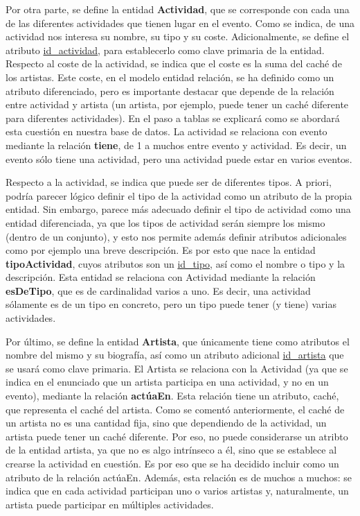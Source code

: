 \documentclass[a4paper,onecolumn]{article}
\begin{document}
\begin{sloppypar}
Por otra parte, se define la entidad \textbf{Actividad}, que se corresponde con cada una de las diferentes actividades que tienen lugar en el evento.
Como se indica, de una actividad nos interesa su nombre, su tipo y su coste. Adicionalmente, se define el atributo \underline{id\_actividad}, para 
establecerlo como clave primaria de la entidad. Respecto al coste de la actividad, se indica que el coste es la suma del caché de los artistas. 
Este coste, en el modelo entidad relación, se ha definido como un atributo diferenciado, pero es importante destacar que depende de la relación entre
actividad y artista (un artista, por ejemplo, puede tener un caché diferente para diferentes actividades). En el paso a tablas se 
explicará como se abordará esta cuestión en nuestra base de datos. La actividad se relaciona con evento mediante la relación \textbf{tiene}, de 1 a 
muchos entre evento y actividad. Es decir, un evento sólo tiene una actividad, pero una actividad puede estar en varios eventos.

Respecto a la actividad, se indica que puede ser de diferentes tipos. A priori, podría parecer lógico definir el tipo de la actividad como un atributo 
de la propia entidad. Sin embargo, parece más adecuado definir el tipo de actividad como una entidad diferenciada, ya que los tipos de actividad 
serán siempre los mismo (dentro de un conjunto), y esto nos permite además definir atributos adicionales como por ejemplo una breve descripción. Es 
por esto que nace la entidad \textbf{tipoActividad}, cuyos atributos son un \underline{id\_tipo}, así como el nombre o tipo y la descripción. Esta 
entidad se relaciona con Actividad mediante la relación \textbf{esDeTipo}, que es de cardinalidad varios a uno. Es decir, una actividad sólamente es 
de un tipo en concreto, pero un tipo puede tener (y tiene) varias actividades.

Por último, se define la entidad \textbf{Artista}, que únicamente tiene como atributos el nombre del mismo y su biografía, así como un atributo 
adicional \underline{id\_artista} que se usará como clave primaria. El Artista se relaciona con la Actividad (ya que se indica en el enunciado que 
un artista participa en una actividad, y no en un evento), mediante la relación \textbf{actúaEn}. Esta relación tiene un atributo, caché, que 
representa el caché del artista. Como se comentó anteriormente, el caché de un artista no es una cantidad fija, sino que dependiendo de la actividad, 
un artista puede tener un caché diferente. Por eso, no puede considerarse un atribto de la entidad artista, ya que no es algo intrínseco a él, 
sino que se establece al crearse la actividad en cuestión. Es por eso que se ha decidido incluir como un atributo de la relación actúaEn. Además, esta 
relación es de muchos a muchos: se indica que en cada actividad participan uno o varios artistas y, naturalmente, un artista puede participar
en múltiples actividades.



\end{sloppypar}
\end{document}
